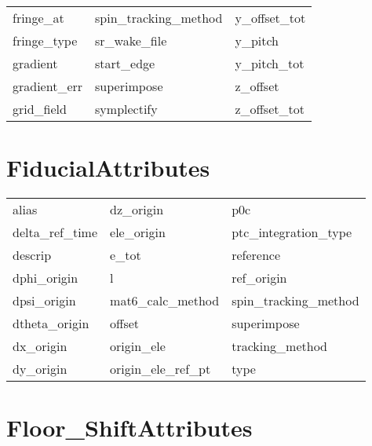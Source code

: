 \begin{tabular}{lll}
fringe_at                   & spin_tracking_method        & y_offset_tot                \\
fringe_type                 & sr_wake_file                & y_pitch                     \\
gradient                    & start_edge                  & y_pitch_tot                 \\
gradient_err                & superimpose                 & z_offset                    \\
grid_field                  & symplectify                 & z_offset_tot                \\
 \bottomrule
 \end{tabular}
 \vfill
 
 \section{FiducialAttributes}
 \label{s:list.fiducial}
 
 \begin{tabular}{lll} \toprule
alias                       & dz_origin                   & p0c                         \\
delta_ref_time              & ele_origin                  & ptc_integration_type        \\
descrip                     & e_tot                       & reference                   \\
dphi_origin                 & l                           & ref_origin                  \\
dpsi_origin                 & mat6_calc_method            & spin_tracking_method        \\
dtheta_origin               & offset                      & superimpose                 \\
dx_origin                   & origin_ele                  & tracking_method             \\
dy_origin                   & origin_ele_ref_pt           & type                        \\
 \bottomrule
 \end{tabular}
 \vfill
 
 \section{Floor_ShiftAttributes}
 \label{s:list.floor.shift}
 
